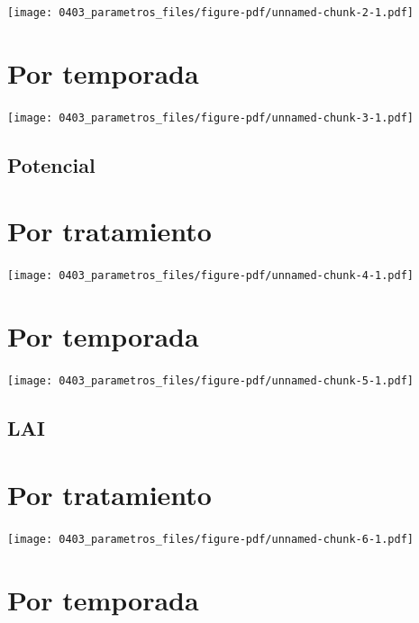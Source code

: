 \documentclass[
  letterpaper,
  DIV=11,
  numbers=noendperiod]{scrreprt}
\begin{document}
\begin{center}
\texttt{[image: 0403\_parametros\_files/figure-pdf/unnamed-chunk-2-1.pdf]}
\end{center}

\chapter{Por temporada}

\begin{center}
\texttt{[image: 0403\_parametros\_files/figure-pdf/unnamed-chunk-3-1.pdf]}
\end{center}

\section{Potencial}\label{potencial-1}

\chapter{Por tratamiento}

\begin{center}
\texttt{[image: 0403\_parametros\_files/figure-pdf/unnamed-chunk-4-1.pdf]}
\end{center}

\chapter{Por temporada}

\begin{center}
\texttt{[image: 0403\_parametros\_files/figure-pdf/unnamed-chunk-5-1.pdf]}
\end{center}

\section{LAI}\label{lai-1}

\chapter{Por tratamiento}

\begin{center}
\texttt{[image: 0403\_parametros\_files/figure-pdf/unnamed-chunk-6-1.pdf]}
\end{center}

\chapter{Por temporada}
\end{document}
